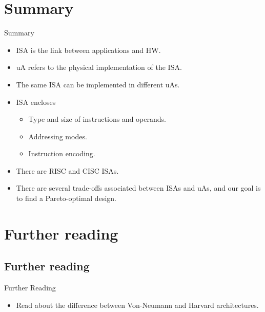 \documentclass[]{slides}
\begin{document}
\section{Summary}
\begin{frame}{Summary}
  \begin{itemize}
  \item \ac{ISA} is the link between applications and \ac{HW}.
  \item \ac{uA} refers to the physical implementation of the \ac{ISA}.
  \item The same \ac{ISA} can be implemented in different \acp{uA}.
   \item \ac{ISA} encloses
  \begin{itemize}
  \item Type and size of instructions and operands.
  \item Addressing modes.
  \item Instruction encoding.
  \end{itemize}
  \item There are \ac{RISC} and \ac{CISC} \acp{ISA}.
  \item There are several trade-offs associated between \acp{ISA} and \acp{uA}, and our goal is to find a Pareto-optimal design.
  \end{itemize}
\end{frame}

\section*{Further reading}
\subsection*{Further reading}
\begin{frame}{Further Reading}
\begin{itemize}
  \item Read about the difference between Von-Neumann and Harvard architectures. 
\end{itemize} 
\end{frame}
\end{document}
